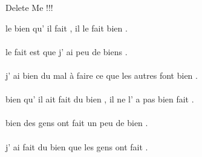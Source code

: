 \documentclass[11pt]{article}
\begin{document}
\begin{center}
 \begin{Huge}
 Delete Me !!!
 \end{Huge}
\end{center}
 \vspace{2.5cm} 
 
le bien qu' il fait , il le fait bien .\\ \vspace{0.3cm} \\le fait est que j' ai peu de biens .\\ \vspace{0.3cm} \\j' ai bien du mal à faire ce que les autres font bien .\\ \vspace{0.3cm} \\bien qu' il ait fait du bien , il ne l' a pas bien fait .\\ \vspace{0.3cm} \\bien des gens ont fait un peu de bien .\\ \vspace{0.3cm} \\j' ai fait du bien que les gens ont fait .\\ \vspace{0.3cm} \\
\end{document}
